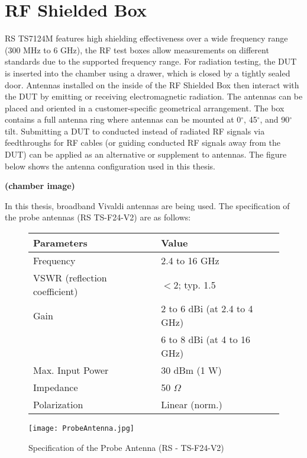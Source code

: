 \section{\acs{RF} Shielded Box}
\acs{RS}\textregistered{} TS7124M features high shielding effectiveness over a wide frequency range (300 MHz to 6 GHz), the \acs{RF} test boxes allow measurements on different standards due to the supported frequency range. For radiation testing, the \acs{DUT} is inserted into the chamber using a drawer, which is closed by a tightly sealed door. Antennas installed on the inside of the \acs{RF} Shielded Box then interact with the \acs{DUT} by emitting or receiving electromagnetic radiation. The antennas can be placed and oriented in a customer-specific geometrical arrangement. The box contains a full antenna ring where antennas can be mounted at 0$^{\circ}$, 45$^{\circ}$, and 90$^{\circ}$ tilt.  Submitting a \acs{DUT} to conducted instead of radiated RF signals via feedthroughs for \acs{RF} cables (or guiding conducted \acs{RF} signals away from the \acs{DUT}) can be applied as an alternative or supplement to antennas. The figure below shows the antenna configuration used in this thesis.

\textbf{(chamber image)}

In this thesis, broadband Vivaldi antennas are being used. The specification of the probe antennas (\acs{RS}\textregistered{} TS-F24-V2) are as follows: 


\begin{figure}[h]
    \begin{minipage}[c]{.7\textwidth}%
        \begin {tabular} {|l|l|} 
\toprule
Parameters & Value \\ 
\midrule 
Frequency & 2.4 to 16 GHz \\
VSWR (reflection coefficient) & $<$2; typ. 1.5 \\
Gain & 2 to 6 dBi (at 2.4 to 4 GHz)\\ 
 & 6 to 8 dBi (at 4 to 16 GHz)\\ 
Max. Input Power & 30 dBm (1 W) \\
Impedance & 50 $\Omega$ \\
Polarization & Linear (norm.)\\
\bottomrule
\end {tabular}    \end{minipage}
    \hfill
    \begin{minipage}[c]{.2\textwidth}
        \texttt{[image: ProbeAntenna.jpg]}
    \end{minipage}
    \caption{Specification of the Probe Antenna (\acs{RS}\textregistered{} - TS-F24-V2)}
\label{fig:probes}
\end{figure}      

